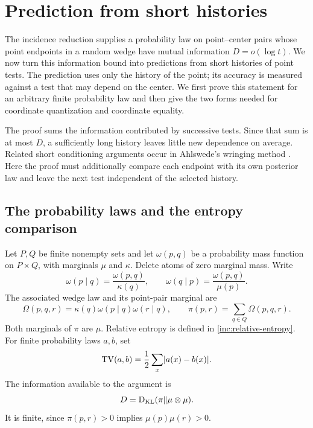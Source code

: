 \section{Prediction from short histories}\label{sec:prediction}

The incidence reduction supplies a probability law on point--center pairs whose
point endpoints in a random wedge have mutual information \(D=o(\log t)\).
We now turn this information bound into predictions from short histories of
point tests.  The prediction uses only the history of the point; its accuracy
is measured against a test that may depend on the center.  We first prove this
statement for an arbitrary finite probability law and then give the two forms
needed for coordinate quantization and coordinate equality.

The proof sums the information contributed by successive tests. Since
that sum is at most \(D\), a sufficiently long history leaves little
new dependence on average. Related short conditioning arguments occur in
Ahlswede's
wringing method \cite[Section~4, Lemma~3]{Ahlswede1982}.
Here the proof must additionally compare each endpoint with its own
posterior law and leave the next test independent of the selected history.

\subsection{The probability laws and the entropy comparison}

Let \(P,Q\) be finite nonempty sets and let \(\omega(p,q)\) be a probability
mass function on \(P\times Q\), with marginals \(\mu\) and \(\kappa\).
Delete atoms of zero marginal mass.  Write
\[
 \omega(p\mid q)=\frac{\omega(p,q)}{\kappa(q)},
 \qquad
 \omega(q\mid p)=\frac{\omega(p,q)}{\mu(p)}.
\]
The associated wedge law and its point-pair marginal are
\begin{equation}\label{pred:wedge-law}
 \Omega(p,q,r)=\kappa(q)\omega(p\mid q)\omega(r\mid q),
 \qquad
 \pi(p,r)=\sum_{q\in Q}\Omega(p,q,r).
\end{equation}
Both marginals of \(\pi\) are \(\mu\). Relative entropy is defined in
\eqref{inc:relative-entropy}. For finite probability laws \(a,b\), set
\[
 \operatorname{TV}(a,b)=\frac12\sum_x\lvert a(x)-b(x)\rvert.
\]
The information available to the argument is
\begin{equation}\label{pred:information}
 D=\operatorname{D_{\mathrm{KL}}}(\pi\Vert\mu\otimes\mu).
\end{equation}
It is finite, since \(\pi(p,r)>0\) implies \(\mu(p)\mu(r)>0\).

